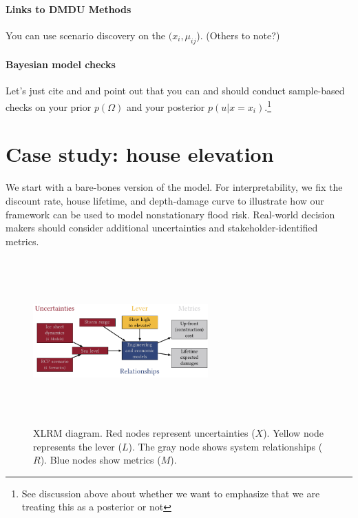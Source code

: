 \documentclass[12pt]{article}
\begin{document}
\paragraph{Links to DMDU Methods}
You can use scenario discovery on the $(x_i, \mu_{ij}$).
(Others to note?)

\paragraph{Bayesian model checks}
Let's just cite \citet{gelman_workflow:2020} and \citet{gabry_visualization:2019} and point out that you can and should conduct sample-based checks on your prior $p(\Omega)$ and your posterior $p(u | x=x_i)$.\footnote{See discussion above about whether we want to emphasize that we are treating this as a posterior or not}

\section{Case study: house elevation}\label{sec:case}

We start with a bare-bones version of the \citet{zarekarizi_suboptimal:2020} model.
For interpretability, we fix the discount rate, house lifetime, and depth-damage curve to illustrate how our framework can be used to model nonstationary flood risk.
Real-world decision makers should consider additional uncertainties and stakeholder-identified metrics.

\begin{figure}
    \centering
    \includegraphics[height=2.5in, width=0.6\textwidth, keepaspectratio=true]{xlrm}
    \caption{
        XLRM diagram.
        Red nodes represent uncertainties ($X$).
        Yellow node represents the lever ($L$).
        The gray node shows system relationships ($R$).
        Blue nodes show metrics ($M$).
    }\label{fig:xlrm}
\end{figure}
\end{document}
